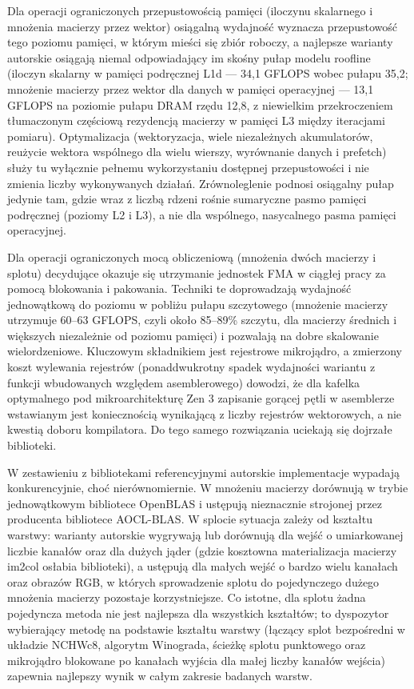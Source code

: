 \documentclass[a4paper,12pt]{book} %
\begin{document}
Dla operacji ograniczonych przepustowością pamięci (iloczynu skalarnego i mnożenia macierzy przez wektor) osiągalną wydajność wyznacza przepustowość tego poziomu pamięci, w którym mieści się zbiór roboczy, a najlepsze warianty autorskie osiągają niemal odpowiadający im skośny pułap modelu roofline (iloczyn skalarny w pamięci podręcznej L1d --- 34,1 GFLOPS wobec pułapu 35,2; mnożenie macierzy przez wektor dla danych w pamięci operacyjnej --- 13,1 GFLOPS na poziomie pułapu DRAM rzędu 12,8, z niewielkim przekroczeniem tłumaczonym częściową rezydencją macierzy w pamięci L3 między iteracjami pomiaru). Optymalizacja (wektoryzacja, wiele niezależnych akumulatorów, reużycie wektora wspólnego dla wielu wierszy, wyrównanie danych i prefetch) służy tu wyłącznie pełnemu wykorzystaniu dostępnej przepustowości i nie zmienia liczby wykonywanych działań. Zrównoleglenie podnosi osiągalny pułap jedynie tam, gdzie wraz z liczbą rdzeni rośnie sumaryczne pasmo pamięci podręcznej (poziomy L2 i L3), a nie dla wspólnego, nasycalnego pasma pamięci operacyjnej.

Dla operacji ograniczonych mocą obliczeniową (mnożenia dwóch macierzy i splotu) decydujące okazuje się utrzymanie jednostek FMA w ciągłej pracy za pomocą blokowania i pakowania. Techniki te doprowadzają wydajność jednowątkową do poziomu w pobliżu pułapu szczytowego (mnożenie macierzy utrzymuje 60--63 GFLOPS, czyli około 85--89\% szczytu, dla macierzy średnich i większych niezależnie od poziomu pamięci) i pozwalają na dobre skalowanie wielordzeniowe. Kluczowym składnikiem jest rejestrowe mikrojądro, a zmierzony koszt wylewania rejestrów (ponaddwukrotny spadek wydajności wariantu z funkcji wbudowanych względem asemblerowego) dowodzi, że dla kafelka optymalnego pod mikroarchitekturę Zen 3 zapisanie gorącej pętli w asemblerze wstawianym jest koniecznością wynikającą z liczby rejestrów wektorowych, a nie kwestią doboru kompilatora. Do tego samego rozwiązania uciekają się dojrzałe biblioteki.

W zestawieniu z bibliotekami referencyjnymi autorskie implementacje wypadają konkurencyjnie, choć nierównomiernie. W mnożeniu macierzy dorównują w trybie jednowątkowym bibliotece OpenBLAS i ustępują nieznacznie strojonej przez producenta bibliotece AOCL-BLAS. W splocie sytuacja zależy od kształtu warstwy: warianty autorskie wygrywają lub dorównują dla wejść o umiarkowanej liczbie kanałów oraz dla dużych jąder (gdzie kosztowna materializacja macierzy im2col osłabia biblioteki), a ustępują dla małych wejść o bardzo wielu kanałach oraz obrazów RGB, w których sprowadzenie splotu do pojedynczego dużego mnożenia macierzy pozostaje korzystniejsze. Co istotne, dla splotu żadna pojedyncza metoda nie jest najlepsza dla wszystkich kształtów; to dyspozytor wybierający metodę na podstawie kształtu warstwy (łączący splot bezpośredni w układzie NCHWc8, algorytm Winograda, ścieżkę splotu punktowego oraz mikrojądro blokowane po kanałach wyjścia dla małej liczby kanałów wejścia) zapewnia najlepszy wynik w całym zakresie badanych warstw.
\end{document}
